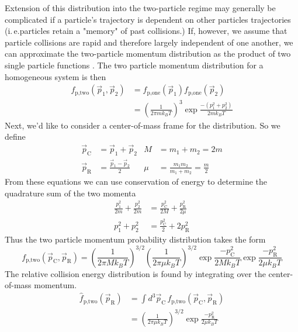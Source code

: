 Extension of this distribution into the two-particle regime may generally be complicated if a particle's trajectory is dependent on other particles trajectories (i.\,e.\;particles retain a "memory" of past collisions.) 
If, however, we assume that particle collisions are rapid and therefore largely independent of one another, we can approximate the two-particle momentum distribution as the product of two single particle functions \cite{Chliamovitch2017,Ehrenfest2015}. 
The two particle momentum distribution for a homogeneous system is then
\begin{equation}
\label{eq:two_particle_prob}
\begin{split}
		 f_\text{p,two}( \vec{p}_1, \vec{p}_2 ) &= f_\text{p,one}( \vec{p}_1 ) f_\text{p,one}( \vec{p}_2 ) \\
		  &= \left(\frac{1}{2 \pi m k_B T}\right)^3 \exp{\frac{-(p_1^2 + p_2^2)}{2 m k_B T}}
\end{split}
\end{equation}
Next, we'd like to consider a center-of-mass frame for the distribution. 
So we define
\begin{align*}
	\vec{p}_\text{C} & = \vec{p}_1 + \vec{p}_2             &	M   &= m_1 + m_2 = 2m \\
	\vec{p}_\text{R} & = \frac{\vec{p}_1 - \vec{p}_2}{2}   &   \mu &= \frac{m_1 m_2}{m_1 + m_2} = \frac{m}{2}
\end{align*}
From these equations we can use conservation of energy to determine the quadrature sum of the two momenta
\begin{align*}
	\frac{p_1^2}{2m} + \frac{p_2^2}{2m} &= \frac{p_\text{C}^2}{2M} + \frac{p_\text{R}^2}{2\mu} \\
	p_1^2 + p_2^2 &= \frac{p_\text{C}^2}{2} + 2 p_\text{R}^2
\end{align*}
Thus the two particle momentum probability distribution takes the form
\begin{equation} \label{eq:two_particle_prob_inf_atomFrame}
		 f_\text{p,two}( \vec{p}_\text{C}, \vec{p}_\text{R} ) = \left(\frac{1}{2 \pi M k_B T}\right)^{3/2} \left(\frac{1}{2 \pi \mu k_B T}\right)^{3/2} 
		 \exp{\frac{-p_\text{C}^2}{2 M k_B T}} \exp{\frac{-p_\text{R}^2}{2 \mu k_B T}}
\end{equation}
The relative collision energy distribution is found by integrating over the center-of-mass momentum.
\begin{equation}
\label{eq:relEnergy_inf}
\begin{split}
	\hat{f}_\text{p,two}(\vec{p}_{\text{R}}) &= \int d^3\vec{p}_\text{C} \, f_\text{p,two}(\vec{p}_\text{C},\vec{p}_\text{R}) \\
	&= \left( \frac{1}{2 \pi \mu k_B T} \right)^{3/2} \exp{\frac{-p_\text{R}^2}{2 \mu k_B T}}
\end{split}
\end{equation}


